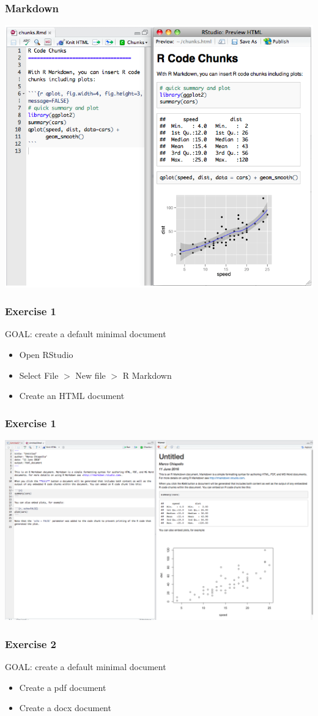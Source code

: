 \documentclass{beamer}
\begin{document}
\begin{frame}
    \frametitle{Markdown}
    \begin{center}\includegraphics[scale=0.35]{figures/RmarkdownExample2.png}\end{center}
\end{frame}
\begin{frame}
    \frametitle{Exercise 1}
    {\sc GOAL: create a default minimal document}
    \begin{itemize}
        \item Open RStudio
            \pause
        \item Select File $>$ New file $>$ R Markdown
            \pause
        \item Create an HTML document
    \end{itemize}
\end{frame}
\begin{frame}
    \frametitle{Exercise 1}
    \begin{center}\includegraphics[scale=0.23]{figures/RmarkdownExample.png}\end{center}
\end{frame}

\begin{frame}
    \frametitle{Exercise 2}
    {\sc GOAL: create a default minimal document}
    \begin{itemize}
        \item Create a pdf document
        \item Create a docx document
    \end{itemize}
\end{frame}
\end{document}
